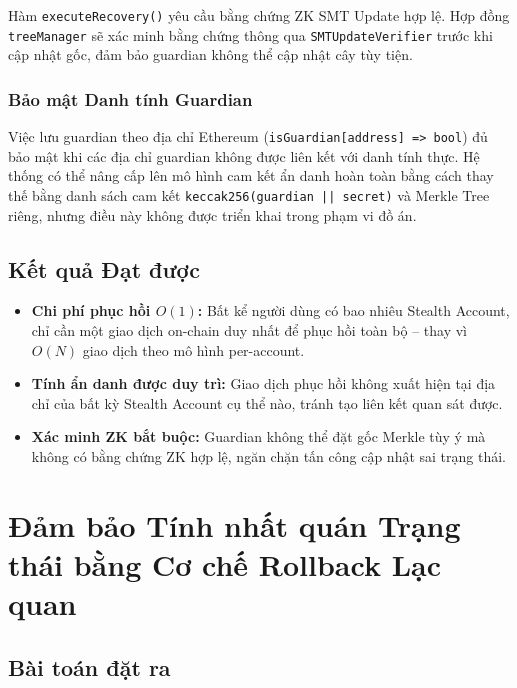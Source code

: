 \documentclass[../DoAn.tex]{subfiles}
\begin{document}
Hàm \texttt{executeRecovery()} yêu cầu bằng chứng ZK SMT Update hợp lệ. Hợp đồng \texttt{treeManager} sẽ xác minh bằng chứng thông qua \texttt{SMTUpdateVerifier} trước khi cập nhật gốc, đảm bảo guardian không thể cập nhật cây tùy tiện.

\subsubsection{Bảo mật Danh tính Guardian}

Việc lưu guardian theo địa chỉ Ethereum (\texttt{isGuardian[address] => bool}) đủ bảo mật khi các địa chỉ guardian không được liên kết với danh tính thực. Hệ thống có thể nâng cấp lên mô hình cam kết ẩn danh hoàn toàn bằng cách thay thế bằng danh sách cam kết \texttt{keccak256(guardian || secret)} và Merkle Tree riêng, nhưng điều này không được triển khai trong phạm vi đồ án.

\subsection{Kết quả Đạt được}
\label{subsec:recovery_result}

\begin{itemize}
    \item \textbf{Chi phí phục hồi $O(1)$:} Bất kể người dùng có bao nhiêu Stealth Account, chỉ cần một giao dịch on-chain duy nhất để phục hồi toàn bộ -- thay vì $O(N)$ giao dịch theo mô hình per-account.
    \item \textbf{Tính ẩn danh được duy trì:} Giao dịch phục hồi không xuất hiện tại địa chỉ của bất kỳ Stealth Account cụ thể nào, tránh tạo liên kết quan sát được.
    \item \textbf{Xác minh ZK bắt buộc:} Guardian không thể đặt gốc Merkle tùy ý mà không có bằng chứng ZK hợp lệ, ngăn chặn tấn công cập nhật sai trạng thái.
\end{itemize}

\section{Đảm bảo Tính nhất quán Trạng thái bằng Cơ chế Rollback Lạc quan}
\label{sec:optimistic_rollback}

\subsection{Bài toán đặt ra}
\label{subsec:sync_problem}
\end{document}
